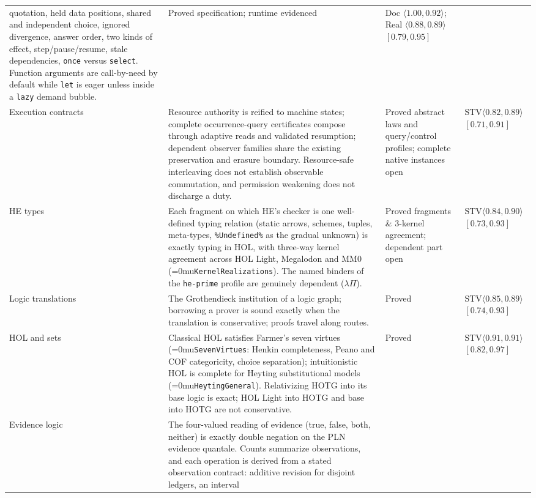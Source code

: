\documentclass[11pt]{article}
\newcommand{\leanname}[1]{\textup{\Urlmuskip=0mu\relax\nolinkurl{#1}}}
\theoremstyle{definition}
\theoremstyle{remark}
\newcommand{\code}[1]{\texttt{#1}}
\begin{document}
{\begin{longtable}{>{\raggedright\arraybackslash}p{2.3cm}
  >{\raggedright\arraybackslash}p{5.9cm}
  >{\raggedright\arraybackslash}p{2.3cm}
  >{\raggedright\arraybackslash}p{2.5cm}}
  quotation, held data positions, shared and independent choice, ignored
  divergence, answer order, two kinds of effect, step/pause/resume, stale
  dependencies, \code{once} versus \code{select}. Function arguments are
  call-by-need by default while \code{let} is eager unless inside a \code{lazy}
  demand bubble. &
  Proved specification; runtime evidenced &
  Doc $\langle 1.00, 0.92\rangle$; Real $\langle 0.88, 0.89\rangle$ $[0.79,0.95]$\\
Execution contracts & Resource authority is reified to machine states;
  complete occurrence-query certificates compose through adaptive reads and
  validated resumption; dependent observer families share the existing
  preservation and erasure boundary. Resource-safe interleaving does not
  establish observable commutation, and permission weakening does not
  discharge a duty. & Proved abstract laws and query/control profiles;
  complete native instances open & $\mathrm{STV}\langle 0.82, 0.89\rangle$ $[0.71,0.91]$\\
HE types & Each fragment on which HE's checker is one well-defined typing
  relation (static arrows, schemes, tuples, meta-types, \code{\%Undefined\%} as
  the gradual unknown) is exactly typing in HOL, with three-way kernel agreement
  across HOL Light, Megalodon and MM0 (\leanname{KernelRealizations}). The named
  binders of the \code{he-prime} profile are genuinely dependent ($\lambda\Pi$). &
  Proved fragments \& 3-kernel agreement; dependent part open &
  $\mathrm{STV}\langle 0.84, 0.90\rangle$ $[0.73,0.93]$\\
Logic translations & The Grothendieck institution of a logic graph; borrowing
  a prover is sound exactly when the translation is conservative; proofs travel
  along routes. & Proved & $\mathrm{STV}\langle 0.85, 0.89\rangle$ $[0.74,0.93]$\\
HOL and sets & Classical HOL satisfies Farmer's seven virtues
  (\leanname{SevenVirtues}: Henkin completeness, Peano and COF categoricity,
  choice separation); intuitionistic HOL is complete for Heyting substitutional
  models (\leanname{HeytingGeneral}). Relativizing HOTG into its base logic is
  exact; HOL Light into HOTG and base into HOTG are not conservative. &
  Proved & $\mathrm{STV}\langle 0.91, 0.91\rangle$ $[0.82,0.97]$\\
Evidence logic & The four-valued reading of evidence (true, false, both,
  neither) is exactly double negation on the PLN evidence quantale. Counts
  summarize observations, and each operation is derived from a stated
  observation contract: additive revision for disjoint ledgers, an interval

\end{longtable}}
\end{document}

